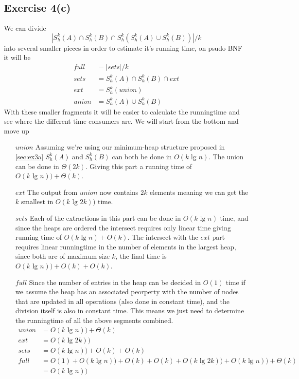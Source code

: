 \subsection{Exercise 4(c)}
We can divide
\[
|S^{k}_{h}(A) \cap S^{k}_{h}(B) \cap S^{k}_{h}(S^{k}_{h}(A) \cup S^{k}_{h}(B))|
/ k
\]
%
into several smaller pieces in order to estimate it's running time, on psudo BNF
it will be
\begin{align*}
  full  &= |sets| / k \\
  sets  &= S^{k}_{h}(A) \cap S^{k}_{h}(B) \cap ext \\
  ext   &= S^{k}_{h}(union) \\
  union &= S^{k}_{h}(A) \cup S^{k}_{h}(B)
\end{align*}
With these smaller fragments it will be easier to calculate the runningtime and
see where the different time consumers are. We will start from the bottom and
move up
\begin{itemize}
\item[$union$] Assuming we're using our minimum-heap structure proposed in
  \ref{sec:ex3a} $S^{k}_{h}(A)$ and $S^{k}_{h}(B)$ can both be done in $O(k
  \text{ lg } n)$. The union can be done in $\Theta(2k)$. Giving this part a
  running time of $O(k \text{ lg } n)) + \Theta(k)$.
%
\item[$ext$] The output from $union$ now contains $2k$ elements meaning we can
  get the $k$ smallest in $O(k \text{ lg } 2k))$ time.
%
\item[$sets$] Each of the extractions in this part can be done in $O(k \text{ lg
  } n)$ time, and since the heaps are ordered the intersect requires only linear
  time giving running time of $O(k \text{ lg } n) + O(k)$. The intersect with
  the $ext$ part requires linear runningtime in the number of elements in the
  largest heap, since both are of maximum size $k$, the final time is $O(k
  \text{ lg } n)) + O(k) + O(k)$.
%
\item[$full$] Since the number of entries in the heap can be decided in $O(1)$
  time if we assume the heap has an associated peorperty with the number of
  nodes that are updated in all operations (also done in constant time), and the
  division itself is also in constant time. This means we just need to determine
  the runningtime of all the above segments combined.
\begin{align*}
  union &= O(k \text{ lg } n)) + \Theta(k) \\
  ext   &= O(k \text{ lg } 2k)) \\
  sets  &= O(k \text{ lg } n)) + O(k) + O(k) \\
  full  &= O(1) + O(k \text{ lg } n)) + O(k) + O(k) + O(k \text{ lg } 2k)) + O(k \text{ lg } n)) + \Theta(k) \\
        &= O(k \text{ lg } n))
\end{align*}
\end{itemize}